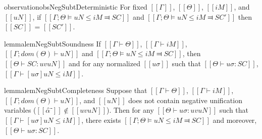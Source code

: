 \begin{restatable}{observation}{obsNegSubtDeterministic}
    \label{obs:neg-subt-deterministic}
    For fixed $[[Γ]]$, $[[Θ]]$, $[[iM]]$, and $[[uN]]$, 
    if $[[Γ ; Θ ⊨ uN ≤ iM ⫤ SC]]$ 
    and $[[Γ ; Θ ⊨ uN ≤ iM ⫤ SC']]$
    then $[[SC]]$ = $[[SC']]$.
\end{restatable}

\begin{restatable}{lemma}{lemNegSubtSoundness}
    \label{lemma:neg-subt-soundness}
    If $[[Γ ⊢ Θ]]$, $[[Γ ⊢ iM]]$, $[[Γ ; dom(Θ) ⊢ uN]]$ and 
    $[[Γ ; Θ ⊨ uN ≤ iM ⫤ SC]]$, then 
    $[[Θ ⊢ SC : uv uN]]$ and 
    for any normalized $[[uσ]]$ such that $[[ Θ  ⊢ uσ : SC ]]$,
    $[[ Γ ⊢ [uσ]uN ≤ iM ]]$.
\end{restatable}

\begin{restatable}{lemma}{lemNegSubtCompleteness}
    \label{lemma:neg-subt-completeness}
    Suppose that $[[Γ ⊢ Θ]]$, $[[Γ ⊢ iM]]$, $[[Γ ; dom(Θ) ⊢ uN]]$,
    and $[[uN]]$ does not contain negative unification variables ($[[α̂⁻]] \notin [[uv uN]]$).
    Then for any $[[Θ ⊢ uσ : uv uN]]$ such that $[[Γ ⊢ [uσ]uN ≤ iM]]$,
    there exists $[[Γ ; Θ ⊨ uN ≤ iM ⫤ SC]]$ and moreover, $[[ Θ ⊢ uσ : SC ]]$.
\end{restatable}
